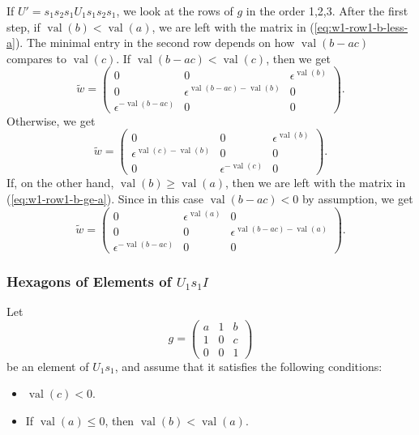 \documentclass{amsart}
\theoremstyle{definition}
\def\e{\epsilon}
\def\w{\widetilde{w}}
\def\val{\mathop{\mathrm{val}}}
\begin{document}
  If $U' = s_1s_2s_1 U_1 s_1s_2s_1$, we look at the rows of $g$ in the order
  1,2,3. After the first step, if $\val(b) < \val(a)$, we are left with the
  matrix in (\ref{eq:w1-row1-b-less-a}).  The minimal entry in the second row
  depends on how $\val(b-ac)$ compares to $\val(c)$.  If $\val(b-ac) <
  \val(c)$, then we get
  \begin{equation*}\w = \begin{pmatrix}
      0 & 0 & \e^{\val(b)} \\
      0 & \e^{\val(b-ac) - \val(b)} & 0 \\
      \e^{-\val(b-ac)} & 0 & 0
    \end{pmatrix}.
  \end{equation*}
  Otherwise, we get
  \begin{equation*}\w = \begin{pmatrix}
      0 & 0 & \e^{\val(b)} \\
      \e^{\val(c)-\val(b)} & 0 & 0 \\
      0 & \e^{-\val(c)} & 0  
    \end{pmatrix}.
  \end{equation*}
  If, on the other hand, $\val(b) \ge \val(a)$, then we are left with the
  matrix in (\ref{eq:w1-row1-b-ge-a}).  Since in this case $\val(b-ac) <
  0$ by assumption, we get
  \begin{equation*}
    \w = \begin{pmatrix}
      0 & \e^{\val(a)} & 0 \\
      0 & 0 & \e^{\val(b-ac) - \val(a)} \\
      \e^{-\val(b-ac)} & 0 & 0
    \end{pmatrix}.
  \end{equation*}

  \subsubsection{Hexagons of Elements of $U_1 s_1 I$}
  \label{sec:hexagons-u-s1}
  Let
  \begin{equation*}
    g =
    \begin{pmatrix}
      a & 1 & b \\
      1 & 0 & c \\
      0 & 0 & 1
    \end{pmatrix}
  \end{equation*}
  be an element of $U_1 s_1$, and assume that it satisfies the following
  conditions:
  \begin{itemize}
    \item $\val(c) < 0$.
    \item If $\val(a) \le 0$, then $\val(b) < \val(a)$.
  \end{itemize}
\end{document}
